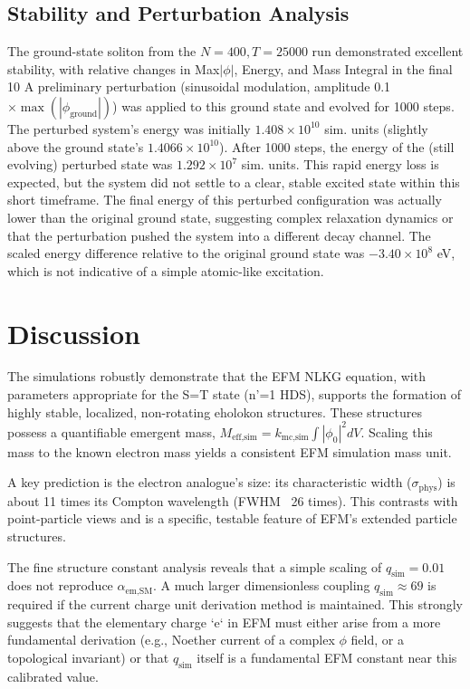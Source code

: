 \documentclass[11pt]{article}
\begin{document}
\subsection{Stability and Perturbation Analysis}
The ground-state soliton from the \(N=400, T=25000\) run demonstrated excellent stability, with relative changes in Max\(|\phi|\), Energy, and Mass Integral in the final 10%
A preliminary perturbation (sinusoidal modulation, amplitude 0.1 \(\times \max(|\phi_{\text{ground}}|)\)) was applied to this ground state and evolved for 1000 steps. The perturbed system's energy was initially \(1.408 \times 10^{10}\) sim. units (slightly above the ground state's \(1.4066 \times 10^{10}\)). After 1000 steps, the energy of the (still evolving) perturbed state was \(1.292 \times 10^7\) sim. units. This rapid energy loss is expected, but the system did not settle to a clear, stable excited state within this short timeframe. The final energy of this perturbed configuration was actually lower than the original ground state, suggesting complex relaxation dynamics or that the perturbation pushed the system into a different decay channel. The scaled energy difference relative to the original ground state was \(-3.40 \times 10^8\) eV, which is not indicative of a simple atomic-like excitation.

\section{Discussion}
The simulations robustly demonstrate that the EFM NLKG equation, with parameters appropriate for the S=T state (n'=1 HDS), supports the formation of highly stable, localized, non-rotating eholokon structures. These structures possess a quantifiable emergent mass, \(M_{\text{eff,sim}} = k_{\text{mc,sim}} \int |\phi_0|^2 dV\). Scaling this mass to the known electron mass yields a consistent EFM simulation mass unit.

A key prediction is the electron analogue's size: its characteristic width (\(\sigma_{\text{phys}}\)) is about 11 times its Compton wavelength (FWHM ~26 times). This contrasts with point-particle views and is a specific, testable feature of EFM's extended particle structures.

The fine structure constant analysis reveals that a simple scaling of \(q_{\text{sim}}=0.01\) does not reproduce \(\alpha_{\text{em,SM}}\). A much larger dimensionless coupling \(q_{\text{sim}} \approx 69\) is required if the current charge unit derivation method is maintained. This strongly suggests that the elementary charge `e` in EFM must either arise from a more fundamental derivation (e.g., Noether current of a complex \(\phi\) field, or a topological invariant) or that \(q_{\text{sim}}\) itself is a fundamental EFM constant near this calibrated value.
\end{document}
